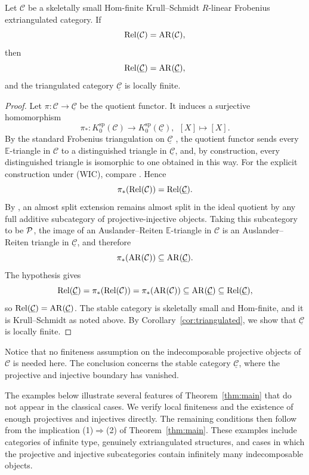 \documentclass[11pt, twoside]{article}
\def\C{\mathcal{C}}
\def\E{\mathbb{E}}
\numberwithin{equation}{section}
\begin{document}
\begin{proposition}\label{prop:frobenius-stable-relations}
Let $\C$ be a skeletally small Hom-finite Krull--Schmidt $R$-linear
Frobenius extriangulated category.  If
\[
 \Rel(\C)=\AR(\C),
\]
then
\[
 \Rel(\underline{\C})=\AR(\underline{\C}),
\]
and the triangulated category $\underline{\C}$ is locally finite.
\end{proposition}

\begin{proof}
Let $\pi\colon\C\to\underline{\C}$ be the quotient functor.  It induces a
surjective homomorphism
\[
 \pi_*\colon K_0^{\mathrm{sp}}(\C)
 \longrightarrow K_0^{\mathrm{sp}}(\underline{\C}),
 ~~[X]\longmapsto[{X}].
\]
By the standard Frobenius triangulation on $\underline{\C}$
\cite[Corollary~7.4 and Remark~7.5]{NakaokaPalu2019}, the quotient functor
sends every $\E$-triangle in $\C$ to a distinguished triangle in
$\underline{\C}$, and, by construction, every distinguished triangle is
isomorphic to one obtained in this way.  For the explicit construction under
(WIC), compare \cite[Definition~6.15 and Theorem~6.20]{NakaokaPalu2019}.
Hence
\[
 \pi_*(\Rel(\C))=\Rel(\underline{\C}).
\]
By \cite[Proposition~5.11]{IyamaNakaokaPalu2024}, an almost split extension
remains almost split in the ideal quotient by any full additive subcategory
of projective-injective objects.  Taking this subcategory to be $\mathcal{P}$, the
image of an Auslander--Reiten $\E$-triangle in $\C$ is an
Auslander--Reiten triangle in $\underline{\C}$, and therefore
\[
 \pi_*(\AR(\C))\subseteq\AR(\underline{\C}).
\]
The hypothesis gives
\[
 \Rel(\underline{\C})
 =\pi_*(\Rel(\C))
 =\pi_*(\AR(\C))
 \subseteq\AR(\underline{\C})
 \subseteq\Rel(\underline{\C}),
\]
so $\Rel(\underline{\C})=\AR(\underline{\C})$.
The stable category is skeletally small and Hom-finite, and it is
Krull--Schmidt as noted above. By Corollary~\ref{cor:triangulated}, we  show
that $\underline{\C}$ is locally finite.
\end{proof}

Notice that no finiteness assumption on the indecomposable projective
objects of $\C$ is needed here.  The conclusion concerns the stable category
$\underline{\C}$, where the projective and injective boundary has
vanished.



The examples below illustrate several features of Theorem~\ref{thm:main} that
do not appear in the classical cases.  We verify local finiteness and the
existence of enough projectives and injectives directly.  The remaining
conditions then follow from the implication
\textup{(1)}$\Rightarrow$\textup{(2)} of Theorem~\ref{thm:main}.  These
examples include categories of infinite type, genuinely extriangulated
structures, and cases in which the projective and injective subcategories
contain infinitely many indecomposable objects.
\end{document}
